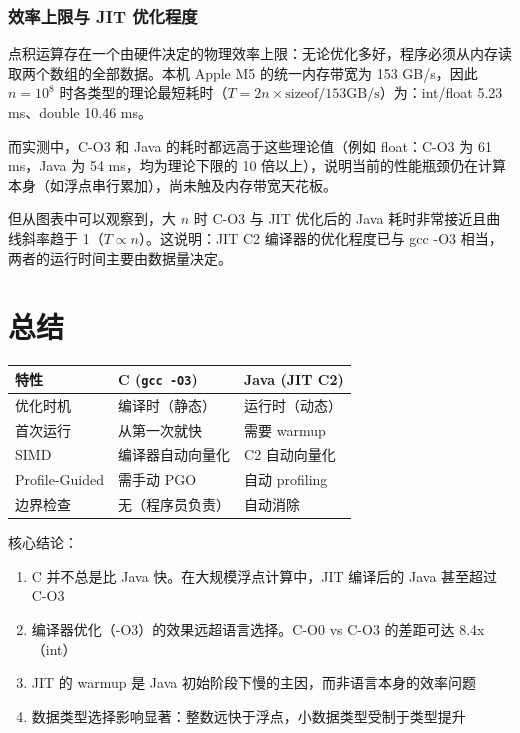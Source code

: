 \documentclass[12pt,a4paper]{article}
\begin{document}
\subsubsection*{效率上限与 JIT 优化程度}

点积运算存在一个由硬件决定的物理效率上限：无论优化多好，程序必须从内存读取两个数组的全部数据。本机 Apple M5 的统一内存带宽为 153 GB/s，因此 $n=10^8$ 时各类型的理论最短耗时（$T = 2n \times \text{sizeof} / 153\text{GB/s}$）为：int/float 5.23 ms、double 10.46 ms。

而实测中，C-O3 和 Java 的耗时都远高于这些理论值（例如 float：C-O3 为 61 ms，Java 为 54 ms，均为理论下限的 10 倍以上），说明当前的性能瓶颈仍在计算本身（如浮点串行累加），尚未触及内存带宽天花板。

但从图表中可以观察到，大 $n$ 时 C-O3 与 JIT 优化后的 Java 耗时非常接近且曲线斜率趋于 1（$T \propto n$）。这说明：JIT C2 编译器的优化程度已与 gcc -O3 相当，两者的运行时间主要由数据量决定。
\section{总结}

\begin{table}[H]
\centering
\begin{tabular}{l l l}
\toprule
特性 & C (\texttt{gcc -O3}) & Java (JIT C2) \\
\midrule
优化时机     & 编译时（静态） & 运行时（动态） \\
首次运行     & 从第一次就快   & 需要 warmup \\
SIMD         & 编译器自动向量化 & C2 自动向量化 \\
Profile-Guided & 需手动 PGO    & 自动 profiling \\
边界检查     & 无（程序员负责） & 自动消除 \\
\bottomrule
\end{tabular}
\end{table}

核心结论：

\begin{enumerate}
  \item C 并不总是比 Java 快。在大规模浮点计算中，JIT 编译后的 Java 甚至超过 C-O3
  \item 编译器优化（-O3）的效果远超语言选择。C-O0 vs C-O3 的差距可达 8.4x（int）
  \item JIT 的 warmup 是 Java 初始阶段下慢的主因，而非语言本身的效率问题
  \item 数据类型选择影响显著：整数远快于浮点，小数据类型受制于类型提升
\end{enumerate}
\end{document}
